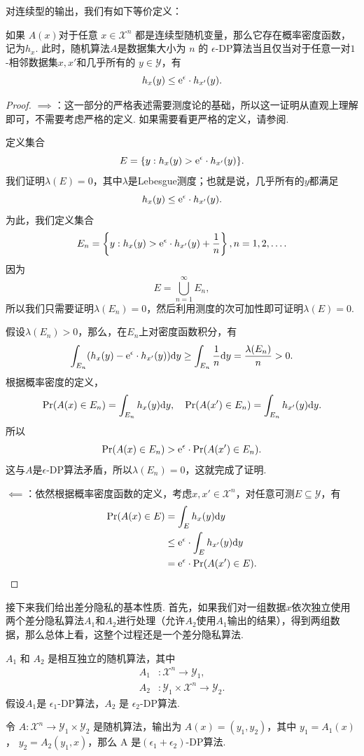 对连续型的输出，我们有如下等价定义：
\begin{proposition}\label{proposition:continuous-dp}
如果 $A(x)$对于任意 $x \in \mathcal X^n$ 都是连续型随机变量，那么它存在概率密度函数，记为$h_{x}$. 此时，随机算法$A$是数据集大小为 $n$ 的 $\epsilon$-DP算法当且仅当对于任意一对$1$-相邻数据集$x, x'$和几乎所有的 $y \in \mathcal Y$，有
    \[
    h_{x}(y) \leq \mathrm{e}^{\epsilon} \cdot h_{x'}(y).
    \]
\end{proposition}
\begin{proof}
$\implies$：这一部分的严格表述需要测度论的基础，所以这一证明从直观上理解即可，不需要考虑严格的定义. 如果需要看更严格的定义，请参阅.

定义集合
\[E=\{y:h_x(y)>\mathrm{e}^\epsilon\cdot h_{x'}(y)\}.\]
我们证明$\lambda(E)=0$，其中$\lambda$是Lebesgue测度；也就是说，几乎所有的$y$都满足
\[h_x(y)\leq\mathrm{e}^\epsilon\cdot h_{x'}(y).\]
为此，我们定义集合
\[E_n=\left\{y:h_x(y)>\mathrm{e}^\epsilon\cdot h_{x'}(y)+\frac{1}{n}\right\}, n=1,2,\dots.\]
因为
\[E=\bigcup_{n=1}^\infty E_n,\]
所以我们只需要证明$\lambda(E_n)=0$，然后利用测度的次可加性即可证明$\lambda(E)=0$.

假设$\lambda(E_n)>0$，那么，在$E_n$上对密度函数积分，有
\[\int_{E_n}(h_x(y)-\mathrm{e}^\epsilon\cdot h_{x'}(y))\mathrm{d} y\geq \int_{E_n}\frac{1}{n}\mathrm{d} y=\frac{\lambda(E_n)}{n}>0.\]
根据概率密度的定义，
\[\Pr(A(x)\in E_n)=\int_{E_n}h_x(y)\mathrm{d} y,\quad\Pr(A(x')\in E_n)=\int_{E_n}h_{x'}(y)\mathrm{d} y.\]
所以
\[\Pr(A(x)\in E_n)>\mathrm{e}^\epsilon\cdot\Pr(A(x')\in E_n).\]
这与$A$是$\epsilon$-DP算法矛盾，所以$\lambda(E_n)=0$，这就完成了证明.

$\impliedby$：依然根据概率密度函数的定义，考虑$x,x'\in\mathcal X^n$，对任意可测$E\subseteq\mathcal Y$，有
\begin{align*}
\Pr(A(x)\in E) &= \int_E h_x(y)\mathrm{d} y \\
&\leq \mathrm{e}^\epsilon\cdot\int_E h_{x'}(y)\mathrm{d} y \\
&= \mathrm{e}^\epsilon\cdot\Pr(A(x')\in E).
\end{align*}
\end{proof}

接下来我们给出差分隐私的基本性质. 首先，如果我们对一组数据$x$依次独立使用两个差分隐私算法$A_1$和$A_2$进行处理（允许$A_2$使用$A_1$输出的结果），得到两组数据，那么总体上看，这整个过程还是一个差分隐私算法. 

\begin{proposition}\label{proposition:composition}
    $A_1$ 和 $A_2$ 是相互独立的随机算法，其中 
    \begin{align*}
        A_1&: \mathcal X^n \to \mathcal Y_1,\\
        A_2&: \mathcal Y_1 \times \mathcal X^n \to \mathcal Y_2.
    \end{align*}
    假设$A_1$是 $\epsilon_1$-DP算法，$A_2$ 是 $\epsilon_2$-DP算法.
    
    令 $A :\mathcal X^n \to \mathcal Y_1 \times \mathcal Y_2$ 是随机算法，输出为 $A(x) = (y_1, y_2)$，其中 $y_1 = A_1(x)$， $y_2 = A_2(y_1, x)$，那么 A 是$(\epsilon_1 + \epsilon_2)$-DP算法.
\end{proposition}

